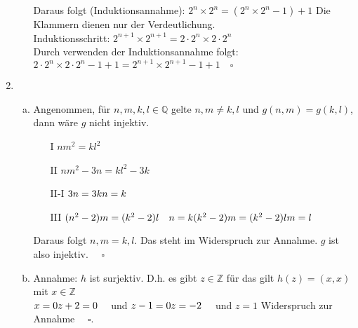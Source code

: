 \documentclass[a4paper]{scrartcl}
\newcommand{\qed}{\quad \square}
\begin{document}
\begin{enumerate}[1.]
\begin{enumerate}[a)]
Daraus folgt (Induktionsannahme): $2^n \times 2^n = (2^n \times 2^n -1) + 1$ Die Klammern dienen nur der Verdeutlichung.\\
Induktionsschritt: $2^{n+1} \times 2^{n+1} = 2\cdot 2^n \times 2 \cdot 2^n$ \\
Durch verwenden der Induktionsannahme folgt:\\
$2\cdot 2^n \times 2 \cdot 2^n -1 +1 = 2^{n+1} \times 2^{n+1} -1 +1 \qed$
\end{enumerate}
\newpage
\item
\begin{enumerate}[a)]
\item
Angenommen, für $n,m,k,l \in \mathbb{Q}$ gelte $n,m \not= k,l$ und $g(n,m)=g(k,l)$, dann wäre $g$ nicht injektiv.\\
\begin{enumerate}
\item[I] $nm^2=kl^2$
\item[II] $nm^2-3n=kl^2-3k$
\item[II-I] $3n=3k\\
n=k$\\
\item[III] $(n^2-2)m = (k^2-2)l \quad n=k \\
(k^2-2)m=(k^2-2)l\\
m=l$
\end{enumerate}
Daraus folgt $n,m = k,l$. Das steht im Widerspruch zur Annahme. $g$ ist also injektiv. $\qed$
\item
Annahme: $h$ ist surjektiv. D.h. es gibt $z \in \mathbb{Z}$ für das gilt $h(z)=(x,x)$ mit $x \in \mathbb{Z}$\\
$x=0\\
z+2 = 0\quad $ und $z-1=0\\
z=-2\quad $ und $z=1$ Widerspruch zur Annahme $\qed$.
\end{enumerate}
\end{enumerate} 
\end{document}
